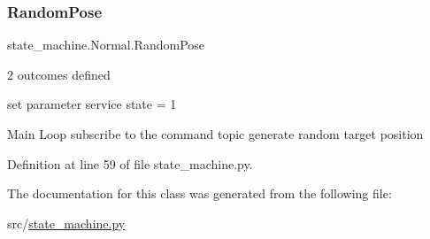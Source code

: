 \subsubsection{\texorpdfstring{Random\+Pose}{RandomPose}}
{\footnotesize\ttfamily state\+\_\+machine.\+Normal.\+Random\+Pose}



2 outcomes defined 

set parameter service state = 1

Main Loop subscribe to the command topic generate random target position 

Definition at line 59 of file state\+\_\+machine.\+py.



The documentation for this class was generated from the following file\+:\begin{DoxyCompactItemize}
\item 
src/\hyperlink{state__machine_8py}{state\+\_\+machine.\+py}\end{DoxyCompactItemize}

